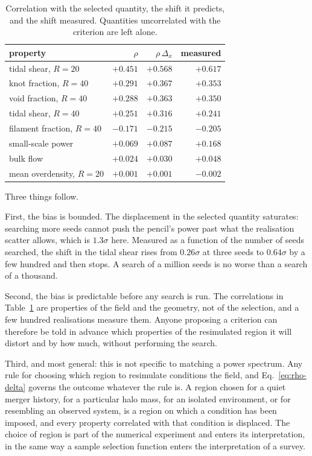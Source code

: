 \documentclass[12pt]{article}
\begin{document}
\begin{table}[htbp]
  \centering
  \caption{Correlation with the selected quantity, the shift it predicts,
  and the shift measured.  Quantities uncorrelated with the criterion are
  left alone.}
  \label{tab:rho}
  \begin{tabular}{lrrr}
    \hline
    property & $\rho$ & $\rho\,\Delta_x$ & measured \\
    \hline
    tidal shear, $R = 20$    & $+0.451$ & $+0.568$ & $+0.617$ \\
    knot fraction, $R = 40$  & $+0.291$ & $+0.367$ & $+0.353$ \\
    void fraction, $R = 40$  & $+0.288$ & $+0.363$ & $+0.350$ \\
    tidal shear, $R = 40$    & $+0.251$ & $+0.316$ & $+0.241$ \\
    filament fraction, $R = 40$ & $-0.171$ & $-0.215$ & $-0.205$ \\
    small-scale power        & $+0.069$ & $+0.087$ & $+0.168$ \\
    bulk flow                & $+0.024$ & $+0.030$ & $+0.048$ \\
    mean overdensity, $R = 20$ & $+0.001$ & $+0.001$ & $-0.002$ \\
    \hline
  \end{tabular}
\end{table}

Three things follow.

First, the bias is bounded.  The displacement in the selected quantity
saturates: searching more seeds cannot push the pencil's power past what
the realisation scatter allows, which is $1.3\sigma$ here.  Measured as a
function of the number of seeds searched, the shift in the tidal shear
rises from $0.26\sigma$ at three seeds to $0.64\sigma$ by a few hundred
and then stops.  A search of a million seeds is no worse than a search of
a thousand.

Second, the bias is predictable before any search is run.  The
correlations in Table~\ref{tab:rho} are properties of the field and the
geometry, not of the selection, and a few hundred realisations measure
them.  Anyone proposing a criterion can therefore be told in advance
which properties of the resimulated region it will distort and by how
much, without performing the search.

Third, and most general: this is not specific to matching a power
spectrum.  Any rule for choosing which region to resimulate conditions
the field, and Eq.~\eqref{eq:rho-delta} governs the outcome whatever the
rule is.  A region chosen for a quiet merger history, for a particular
halo mass, for an isolated environment, or for resembling an observed
system, is a region on which a condition has been imposed, and every
property correlated with that condition is displaced.  The choice of
region is part of the numerical experiment and enters its
interpretation, in the same way a sample selection function enters the
interpretation of a survey.
\end{document}
